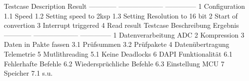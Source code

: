 \markdownRendererInterblockSeparator
{}\markdownRendererInterblockSeparator
{}\markdownRendererPipe{} Testcase \markdownRendererPipe{} Description \markdownRendererPipe{} Result \markdownRendererPipe{} \markdownRendererPipe{} ------------ \markdownRendererPipe{} -------------------- \markdownRendererPipe{} --------------\markdownRendererPipe{} \markdownRendererPipe{} 1 \markdownRendererPipe{} Configuration \markdownRendererPipe{} \markdownRendererPipe{} \markdownRendererPipe{} 1.1 \markdownRendererPipe{} Speed \markdownRendererPipe{} \markdownRendererPipe{} \markdownRendererPipe{} 1.2 \markdownRendererPipe{} Setting speed to 2ksp \markdownRendererPipe{} \markdownRendererPipe{} \markdownRendererPipe{} 1.3 \markdownRendererPipe{} Setting Resolution to 16 bit \markdownRendererPipe{} \markdownRendererPipe{} \markdownRendererPipe{} 2 \markdownRendererPipe{} Start of convertion \markdownRendererPipe{} \markdownRendererPipe{} \markdownRendererPipe{} 3 \markdownRendererPipe{} Interrupt triggered \markdownRendererPipe{} \markdownRendererPipe{} \markdownRendererPipe{} 4 \markdownRendererPipe{} Read result \markdownRendererPipe{} \markdownRendererPipe{}\markdownRendererInterblockSeparator
{}\markdownRendererInterblockSeparator
{}\markdownRendererPipe{} Testcase \markdownRendererPipe{} Beschreibung \markdownRendererPipe{} Ergebnis \markdownRendererPipe{} \markdownRendererPipe{} ------------ \markdownRendererPipe{} -------------------- \markdownRendererPipe{} --------------\markdownRendererPipe{} \markdownRendererPipe{} 1 \markdownRendererPipe{} Datenverarbeitung ADC \markdownRendererPipe{} \markdownRendererPipe{} \markdownRendererPipe{} 2 \markdownRendererPipe{} Kompression \markdownRendererPipe{} \markdownRendererPipe{} \markdownRendererPipe{} 3 \markdownRendererPipe{} Daten in Pakte fassen \markdownRendererPipe{} \markdownRendererPipe{} \markdownRendererPipe{} 3.1 \markdownRendererPipe{} Prüfsummen \markdownRendererPipe{} \markdownRendererPipe{} \markdownRendererPipe{} 3.2 \markdownRendererPipe{} Prüfpakete \markdownRendererPipe{} \markdownRendererPipe{} \markdownRendererPipe{} 4 \markdownRendererPipe{} Datenübertragung Telemetrie \markdownRendererPipe{} \markdownRendererPipe{} \markdownRendererPipe{} 5 \markdownRendererPipe{} Mutlithreading \markdownRendererPipe{} \markdownRendererPipe{} \markdownRendererPipe{} 5.1 \markdownRendererPipe{} Keine Deadlocks \markdownRendererPipe{} \markdownRendererPipe{} \markdownRendererPipe{} 6 \markdownRendererPipe{} DAPI Funktionalität \markdownRendererPipe{} \markdownRendererPipe{} \markdownRendererPipe{} 6.1 \markdownRendererPipe{} Fehlerhafte Befehle \markdownRendererPipe{} \markdownRendererPipe{} \markdownRendererPipe{} 6.2 \markdownRendererPipe{} Wiedersprüchliche Befehle \markdownRendererPipe{} \markdownRendererPipe{} \markdownRendererPipe{} 6.3 \markdownRendererPipe{}Einstellung MCU\markdownRendererPipe{} \markdownRendererPipe{} \markdownRendererPipe{} 7 \markdownRendererPipe{} Speicher \markdownRendererPipe{} \markdownRendererPipe{} \markdownRendererPipe{} 7.1 \markdownRendererPipe{} s.u. \markdownRendererPipe{} \markdownRendererPipe{}\markdownRendererInterblockSeparator
